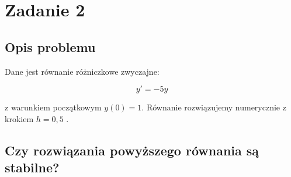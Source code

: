 \documentclass{article}
\begin{document}
	\newpage


	\section*{Zadanie 2}
	
	\subsection*{Opis problemu}

	Dane jest równanie różniczkowe zwyczajne:

	\begin{equation}
		y' = -5y
	\end{equation}

	z warunkiem początkowym $y(0) = 1$. Równanie rozwiązujemy numerycznie z krokiem $h = 0,5$ . 

	\subsection*{Czy rozwiązania powyższego równania są stabilne?}


	
	
	
	
	
	
\end{document}
